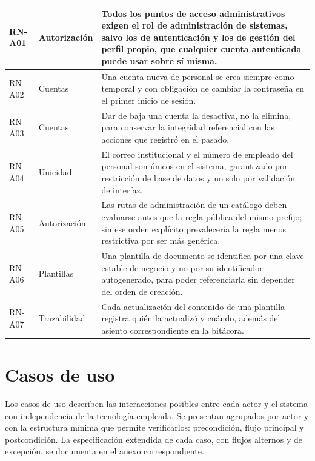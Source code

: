 \begin{longtable}{|p{1.7cm}|p{2.7cm}|p{9.7cm}|}
		RN-A01 & Autorización & Todos los puntos de acceso administrativos exigen el rol de
		administración de sistemas, salvo los de autenticación y los de gestión del perfil propio,
		que cualquier cuenta autenticada puede usar sobre sí misma. \\ \hline
	
		RN-A02 & Cuentas & Una cuenta nueva de personal se crea siempre como temporal y con
		obligación de cambiar la contraseña en el primer inicio de sesión. \\ \hline
	
		RN-A03 & Cuentas & Dar de baja una cuenta la desactiva, no la elimina, para conservar la
		integridad referencial con las acciones que registró en el pasado. \\ \hline
	
		RN-A04 & Unicidad & El correo institucional y el número de empleado del personal son únicos
		en el sistema, garantizado por restricción de base de datos y no solo por validación de
		interfaz. \\ \hline
	
		RN-A05 & Autorización & Las rutas de administración de un catálogo deben evaluarse antes que
		la regla pública del mismo prefijo; sin ese orden explícito prevalecería la regla menos
		restrictiva por ser más genérica. \\ \hline
	
		RN-A06 & Plantillas & Una plantilla de documento se identifica por una clave estable de
		negocio y no por su identificador autogenerado, para poder referenciarla sin depender del
		orden de creación. \\ \hline
	
		RN-A07 & Trazabilidad & Cada actualización del contenido de una plantilla registra quién la
		actualizó y cuándo, además del asiento correspondiente en la bitácora. \\ \hline
	\end{longtable}
	
	\normalsize
	\setlength{\tabcolsep}{6pt}
	\renewcommand{\arraystretch}{1}
	
	\section{Casos de uso}
	\label{sec:casos_uso}
	Los casos de uso describen las interacciones posibles entre cada actor y el sistema con
	independencia de la tecnología empleada. Se presentan agrupados por actor y con la estructura
	mínima que permite verificarlos: precondición, flujo principal y postcondición. La especificación
	extendida de cada caso, con flujos alternos y de excepción, se documenta en el anexo
	correspondiente.
	
